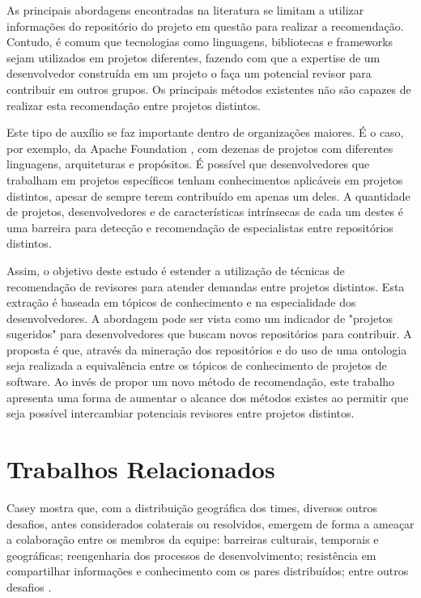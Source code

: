 \documentclass[peerreview]{acmart}
\begin{document}
As principais abordagens encontradas na literatura se limitam a utilizar informações do repositório do projeto em questão para realizar a recomendação. Contudo, é comum que tecnologias como linguagens, bibliotecas e frameworks sejam utilizados em projetos diferentes, fazendo com que a expertise de um desenvolvedor construída em um projeto o faça um potencial revisor para contribuir em outros grupos. Os principais métodos existentes não são capazes de realizar esta recomendação entre projetos distintos.

Este tipo de auxílio se faz importante dentro de organizações maiores. É o caso, por exemplo, da Apache Foundation \cite{chelkowski2016}, com dezenas de projetos com diferentes linguagens, arquiteturas e propósitos. É possível que desenvolvedores que trabalham em projetos específicos tenham conhecimentos aplicáveis em projetos distintos, apesar de sempre terem contribuído em apenas um deles. A quantidade de projetos, desenvolvedores e de características intrínsecas de cada um destes é uma barreira para detecção e recomendação de especialistas entre repositórios distintos.

Assim, o objetivo deste estudo é estender a utilização de técnicas de recomendação de revisores para atender demandas entre projetos distintos. Esta extração é baseada em tópicos de conhecimento e na especialidade dos desenvolvedores. A abordagem pode ser vista como um indicador de "projetos sugeridos" para desenvolvedores que buscam novos repositórios para contribuir. A proposta é que, através da mineração dos repositórios e do uso de uma ontologia seja realizada a equivalência entre os tópicos de conhecimento de projetos de software. Ao invés de propor um novo método de recomendação, este trabalho apresenta uma forma de aumentar o alcance dos métodos existes ao permitir que seja possível intercambiar potenciais revisores entre projetos distintos.

\section{Trabalhos Relacionados}

Casey \cite{casey2010} mostra que, com a distribuição geográfica dos times, diversos outros desafios, antes considerados colaterais ou resolvidos, emergem de forma a ameaçar a colaboração entre os membros da equipe: barreiras culturais, temporais e geográficas; reengenharia dos processos de desenvolvimento; resistência em compartilhar informações e conhecimento com os pares distribuídos; entre outros desafios \cite{pimentel2008, silva2009}.
\end{document}
